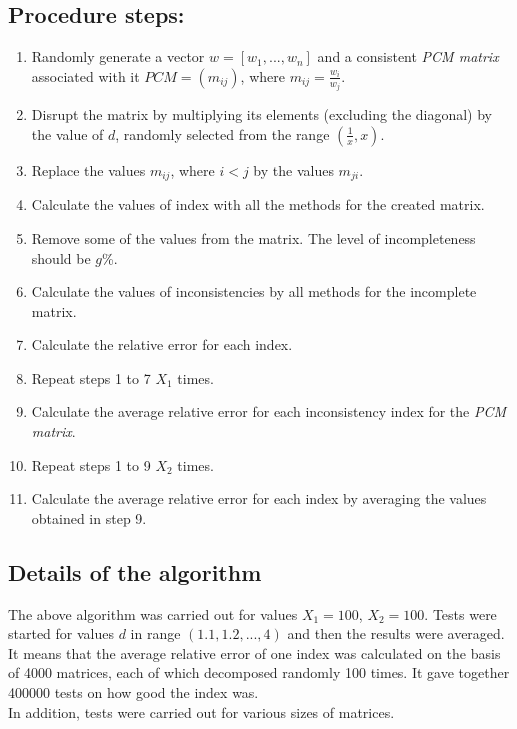 \subsection{Procedure steps:}
\begin{enumerate}
\item Randomly generate a vector $w=[w_{1},...,w_{n}]$ and a consistent \textit{PCM matrix} associated with it $PCM=\left(m_{ij}\right)$, where $m_{ij}=\frac{w_{i}}{w_{j}}$.
\item Disrupt the matrix by multiplying its elements (excluding the diagonal) by the value of $d$, randomly selected from the range $\left(\frac{1}{x},x\right)$.

\item Replace the values $m_{ij}$, where $i<j$ by the values $m_{ji}$.

\item Calculate the values of index with all the methods for the created matrix.

\item Remove some of the values from the matrix. The level of incompleteness should be $g$\%.

\item Calculate the values of inconsistencies by all methods for the incomplete matrix.

\item Calculate the relative error for each index.

\item Repeat steps 1 to 7 $X_{1}$ times.

\item Calculate the average relative error for each inconsistency index for the \textit{PCM matrix}.

\item Repeat steps 1 to 9 $X_{2}$ times.

\item Calculate the average relative error for each index by averaging the values obtained in step 9.

\end{enumerate}


\subsection{Details of the algorithm}
The above algorithm was carried out for values $X_{1}=100$, $X_{2}=100$. Tests were started for values $d$ in range $\left(1.1,1.2,...,4\right)$ and then the results were averaged. It means that the average relative error of one index was calculated on the basis of 4000 matrices, each of which decomposed randomly 100 times. It gave together 400000 tests on how good the index was. 
\\
In addition, tests were carried out for various sizes of matrices.

